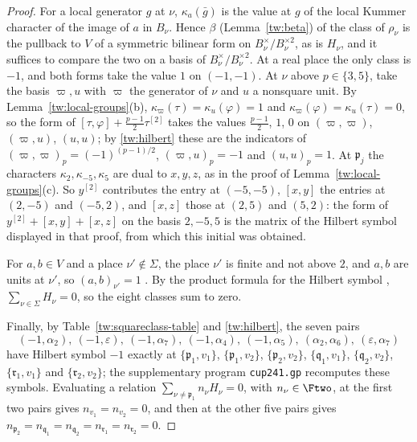 \begin{proof}
For a local generator $g$ at $\nu$, $\kappa_a(\bar g)$ is the value at $g$ of
the local Kummer character of the image of $a$ in $B_\nu$. Hence
$\beta$ (Lemma~\ref{tw:beta}) of the class of $\rho_\nu$ is the pullback to $V$ of a symmetric
bilinear form on $B_\nu^\times/B_\nu^{\times2}$, as is $H_\nu$, and it
suffices to compare the two on a basis of $B_\nu^\times/B_\nu^{\times2}$. At a
real place the only class is $-1$, and both forms take the value $1$ on
$(-1,-1)$. At $\nu$ above $p\in\{3,5\}$, take the basis $\varpi,u$ with
$\varpi$ the generator of $\nu$ and $u$ a nonsquare unit. By
Lemma~\ref{tw:local-groups}(b), $\kappa_\varpi(\tau)=\kappa_u(\varphi)=1$ and
$\kappa_\varpi(\varphi)=\kappa_u(\tau)=0$, so the form of
$[\tau,\varphi]+\frac{p-1}2\tau^{[2]}$ takes the values $\frac{p-1}2$, $1$,
$0$ on $(\varpi,\varpi)$, $(\varpi,u)$, $(u,u)$; by \eqref{tw:hilbert} these
are the indicators of $(\varpi,\varpi)_p=(-1)^{(p-1)/2}$, $(\varpi,u)_p=-1$
and $(u,u)_p=1$. At $\mathfrak p_j$ the characters $\kappa_2,\kappa_{-5},\kappa_5$
are dual to $x,y,z$, as in the proof of Lemma~\ref{tw:local-groups}(c). So
$y^{[2]}$ contributes the entry at $(-5,-5)$, $[x,y]$ the entries at $(2,-5)$
and $(-5,2)$, and $[x,z]$ those at $(2,5)$ and $(5,2)$: the form of
$y^{[2]}+[x,y]+[x,z]$ on the basis $2,-5,5$ is the matrix of the Hilbert
symbol displayed in that proof, from which this initial was obtained.

For $a,b\in V$ and a place $\nu'\notin\Sigma$, the place $\nu'$ is finite
and not above $2$, and $a,b$ are units at $\nu'$, so $(a,b)_{\nu'}=1$
\cite[Chapter~VIII, 5.8]{MilneCFT}. By the
product formula for the Hilbert symbol \cite[Chapter~V, Example~5.4]{MilneCFT},
$\sum_{\nu\in\Sigma}H_\nu=0$, so the eight classes sum to zero.

Finally, by Table~\ref{tw:squareclass-table} and \eqref{tw:hilbert}, the
seven pairs
\[
 (-1,\alpha_2),\ (-1,\varepsilon),\ (-1,\alpha_7),\ (-1,\alpha_4),\
 (-1,\alpha_5),\ (\alpha_2,\alpha_6),\ (\varepsilon,\alpha_7)
\]
have Hilbert symbol $-1$ exactly at $\{\mathfrak p_1,v_1\}$,
$\{\mathfrak p_1,v_2\}$, $\{\mathfrak p_2,v_2\}$, $\{\mathfrak q_1,v_1\}$,
$\{\mathfrak q_2,v_2\}$, $\{\mathfrak r_1,v_1\}$ and $\{\mathfrak r_2,v_2\}$;
the supplementary program \texttt{cup241.gp} recomputes these symbols.
Evaluating a relation $\sum_{\nu\ne\mathfrak p_1}n_\nu H_\nu=0$, with
$n_\nu\in\Ftwo$, at the first two pairs gives $n_{v_1}=n_{v_2}=0$, and then
at the other five pairs gives
$n_{\mathfrak p_2}=n_{\mathfrak q_1}=n_{\mathfrak q_2}=n_{\mathfrak r_1}=n_{\mathfrak r_2}=0$.
\end{proof}

